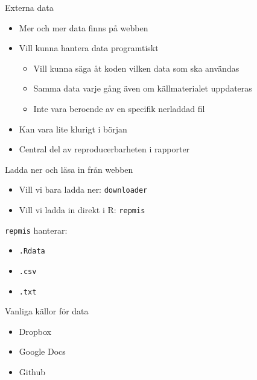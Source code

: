 \documentclass[
  11pt,
  ignorenonframetext,
  handout]{beamer}
\providecommand{\tightlist}{%
  \setlength{\itemsep}{0pt}\setlength{\parskip}{0pt}}
\begin{document}
\begin{frame}{Externa data}
\protect{}\label{externa-data}
\begin{itemize}
\tightlist
\item
  Mer och mer data finns på webben
\item
  Vill kunna hantera data programtiskt

  \begin{itemize}
  \tightlist
  \item
    Vill kunna säga åt koden vilken data som ska användas
  \item
    Samma data varje gång även om källmaterialet uppdateras
  \item
    Inte vara beroende av en specifik nerladdad fil
  \end{itemize}
\item
  Kan vara lite klurigt i början
\item
  Central del av reproducerbarheten i rapporter
\end{itemize}
\end{frame}

\begin{frame}{Ladda ner och läsa in från webben}
\protect{}\label{ladda-ner-och-luxe4sa-in-fruxe5n-webben}
\begin{itemize}
\tightlist
\item
  Vill vi bara ladda ner: \texttt{downloader}
\item
  Vill vi ladda in direkt i R: \texttt{repmis}
\end{itemize}

\texttt{repmis} hanterar:

\begin{itemize}
\tightlist
\item
  \texttt{.Rdata}
\item
  \texttt{.csv}
\item
  \texttt{.txt}
\end{itemize}
\end{frame}

\begin{frame}{Vanliga källor för data}
\protect{}\label{vanliga-kuxe4llor-fuxf6r-data}
\begin{itemize}
\tightlist
\item
  Dropbox
\item
  Google Docs
\item
  Github
\end{itemize}
\end{frame}
\end{document}
